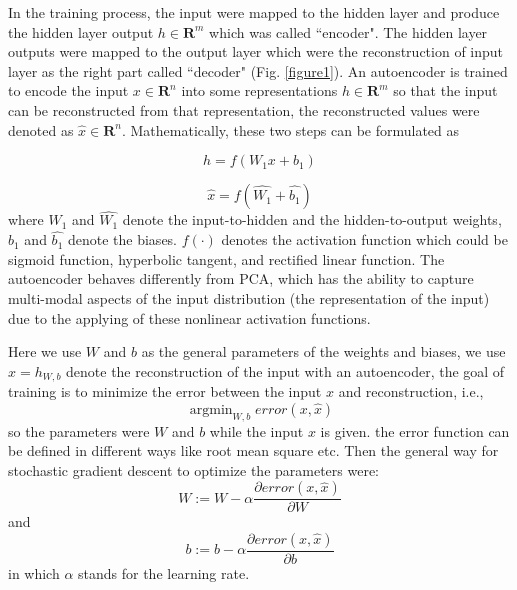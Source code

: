 \documentclass[journal]{IEEEtran}
\DeclareMathOperator*{\argmin}{argmin}
\begin{document}
In the training process, the input were mapped to the hidden layer and produce the hidden layer output $h\in{\mathbf{R}^m}$ which was called ``encoder". The hidden layer outputs were mapped to the output layer which were the reconstruction of input layer as the right part called ``decoder" (Fig. \ref{figure1}). An autoencoder is trained to encode the input $x\in{\mathbf{R}^n}$ into some representations $h\in{\mathbf{R}^m}$ so that the input can be reconstructed from that representation\cite{bengio2009}, the reconstructed values were denoted as $\hat{x}\in{\mathbf{R}^n}$. Mathematically, these two steps can be formulated as

\begin{equation}
h = f(W_{1}x+b_{1})
\end{equation}

\begin{equation}
\hat{x}= f(\hat{W_{1}} + \hat{b_{1}})
\end{equation}
where $W_1$ and $\hat{W_1}$ denote the input-to-hidden and the hidden-to-output weights, $b_1$ and $\hat{b_1}$ denote the biases. $f(\cdot)$ denotes the activation function which could be sigmoid function, hyperbolic tangent, and rectified linear function. The autoencoder behaves differently from PCA, which has the ability to capture multi-modal aspects of the input distribution (the representation of the input) \cite{jap} due to the applying of these nonlinear activation functions.

Here we use $W$ and $b$ as the general parameters of the weights and biases, we use  $\hat{x}=h_{W,b}$ denote the reconstruction of the input with an autoencoder, the goal of training is to minimize the error between the input $x$ and reconstruction, i.e.,
\begin{equation}
 \mathop{\argmin}_{W,b}{error(x,\hat{x})}
\end{equation}
so the parameters were $W$ and $b$ while the input $x$ is given. the error function can be defined in different ways like root mean square etc. Then the general way for stochastic gradient descent to optimize the parameters were:
\begin{equation}
W := W - \alpha \frac{\partial error(x, \hat{x})}{\partial W}
\end{equation}
and
\begin{equation}
b := b - \alpha \frac{\partial error(x, \hat{x})}{\partial b}
\end{equation}
in which $\alpha $ stands for the learning rate. 
\end{document}
